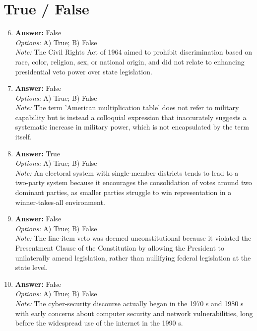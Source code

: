 \documentclass[12pt]{article}
\begin{document}
\section*{True / False}
\begin{enumerate}[label=\arabic*.]
\setcounter{enumi}{5}
\item \textbf{Answer:} False
\\ \textit{Options:} A) True; B) False
\\ \textit{Note:} The Civil Rights Act of 1964 aimed to prohibit discrimination based on race, color, religion, sex, or national origin, and did not relate to enhancing presidential veto power over state legislation.
\item \textbf{Answer:} False
\\ \textit{Options:} A) True; B) False
\\ \textit{Note:} The term 'American multiplication table' does not refer to military capability but is instead a colloquial expression that inaccurately suggests a systematic increase in military power, which is not encapsulated by the term itself.
\item \textbf{Answer:} True
\\ \textit{Options:} A) True; B) False
\\ \textit{Note:} An electoral system with single-member districts tends to lead to a two-party system because it encourages the consolidation of votes around two dominant parties, as smaller parties struggle to win representation in a winner-takes-all environment.
\item \textbf{Answer:} False
\\ \textit{Options:} A) True; B) False
\\ \textit{Note:} The line-item veto was deemed unconstitutional because it violated the Presentment Clause of the Constitution by allowing the President to unilaterally amend legislation, rather than nullifying federal legislation at the state level.
\item \textbf{Answer:} False
\\ \textit{Options:} A) True; B) False
\\ \textit{Note:} The cyber-security discourse actually began in the 1970 s and 1980 s with early concerns about computer security and network vulnerabilities, long before the widespread use of the internet in the 1990 s.
\end{enumerate}
\end{document}
